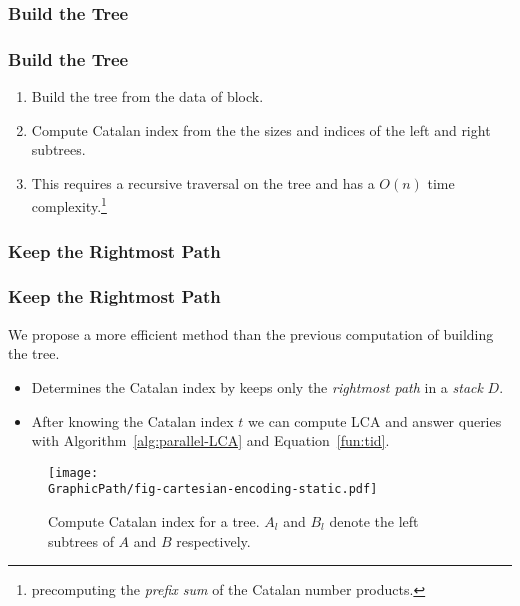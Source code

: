 \subsubsection{Build the Tree}
\begin{frame}
    \frametitle{Build the Tree}
    \begin{enumerate}
    	\setlength\itemsep{1em}
    	\item 
    		Build the tree from the data of block.
    	\item
    		Compute Catalan index from the the sizes and indices of the
			left and right subtrees.  
		\item 
			This requires a recursive traversal on the tree and has a
			$O(n)$ time complexity.\footnote{precomputing the {\em
			prefix sum} of the Catalan number products.}
	\end{enumerate}

    \begin{center}
		\scalebox{1} { \begin{minipage}{\textwidth}
			
			\end{minipage}
		}
	\end{center}
\end{frame}

\subsubsection{Keep the Rightmost Path}
\begin{frame}
	\frametitle{Keep the Rightmost Path}
	We propose a more efficient method than the previous computation of
	building the tree.

	\begin{itemize}
		\setlength\itemsep{1em}
		\item 
			Determines the Catalan index by keeps only the {\em
			rightmost path} in a {\em stack} $D$.
		\item
			After knowing the Catalan index $t$ we can compute LCA and
			answer queries with Algorithm~\ref{alg:parallel-LCA} and
			Equation~\ref{fun:tid}.
	\end{itemize}
	\begin{center}
		\scalebox{0.8} { \begin{minipage}{0.8\textwidth}
			\begin{figure}[!thb]
			  \centering
			  \texttt{[image: \\GraphicPath/fig-cartesian-encoding-static.pdf]}
			  \caption{Compute Catalan index for a tree.  $A_l$ and $B_l$ denote
			    the left subtrees of $A$ and $B$ respectively.}
			  \label{fig:fig-cartesian-encoding-static}
			\end{figure}
			\end{minipage}
		}
	\end{center}
\end{frame}

